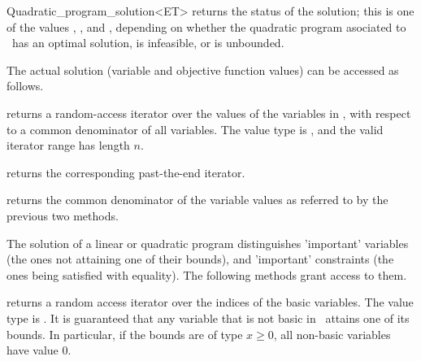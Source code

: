\begin{ccRefClass}{Quadratic_program_solution<ET>}
{returns the status of the solution;
this is one of the values , , and 
, depending on whether the quadratic program asociated
to \ccVar\ has an optimal solution, is infeasible, or is unbounded.}

The actual solution (variable and objective function values) can be
accessed as follows.






{returns a random-access iterator  over the values 
of the variables in \ccVar, with respect to a common
denominator of all variables. The value type is , and the valid
iterator range has length $n$.}

{returns the corresponding past-the-end iterator.}

{returns the common denominator of the variable values as referred to
by the previous two methods.}

The solution of a linear or quadratic program distinguishes 'important'
variables (the ones not attaining one of their bounds), and 'important'
constraints (the ones being satisfied with equality). The following
methods grant access to them.

{returns a random access iterator over the indices of the basic
variables. The value type is . It is guaranteed that any 
variable that is not basic in \ccVar\ attains one of its bounds. 
In particular, if the bounds are of type $x\geq 0$, all non-basic 
variables have value $0$.}


\end{ccRefClass}
